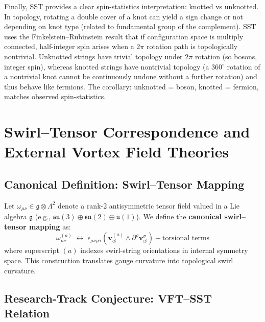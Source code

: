 \documentclass[10pt,reprint,aps,onecolumn,nofootinbib]{revtex4-2}
\begin{document}
Finally, SST provides a clear spin-statistics interpretation: knotted vs unknotted. In topology, rotating a double cover of a knot can yield a sign change or not depending on knot type (related to fundamental group of the complement). SST uses the Finkelstein–Rubinstein result that if configuration space is multiply connected, half-integer spin arises when a $2\pi$ rotation path is topologically nontrivial. Unknotted strings have trivial topology under $2\pi$ rotation (so bosons, integer spin), whereas knotted strings have nontrivial topology (a $360^\circ$ rotation of a nontrivial knot cannot be continuously undone without a further rotation) and thus behave like fermions. The corollary: unknotted = boson, knotted = fermion, matches observed spin-statistics.

\section{Swirl–Tensor Correspondence and External Vortex Field Theories}
\label{sec:swirl_tensor_correspondence}

\subsection*{Canonical Definition: Swirl–Tensor Mapping}

    Let $\omega_{\mu\nu} \in \mathfrak{g} \otimes \Lambda^2$ denote a rank-2 antisymmetric tensor field valued in a Lie algebra $\mathfrak{g}$ (e.g., $\mathfrak{su}(3) \oplus \mathfrak{su}(2) \oplus \mathfrak{u}(1)$). We define the \textbf{canonical swirl–tensor mapping} as:
    \begin{equation}
        \omega_{\mu\nu}^{(a)} \;\longleftrightarrow\; \epsilon_{\mu\nu\rho\sigma} \left( \mathbf{v}_{\!\boldsymbol{\circlearrowleft}}^{(a)} \wedge \partial^\rho \mathbf{v}^{\sigma}_{\!\boldsymbol{\circlearrowleft}} \right) + \text{torsional terms}
    \end{equation}
    where superscript $(a)$ indexes swirl-string orientations in internal symmetry space. This construction translates gauge curvature into topological swirl curvature.

\subsection*{Research-Track Conjecture: VFT–SST Relation}
\end{document}
